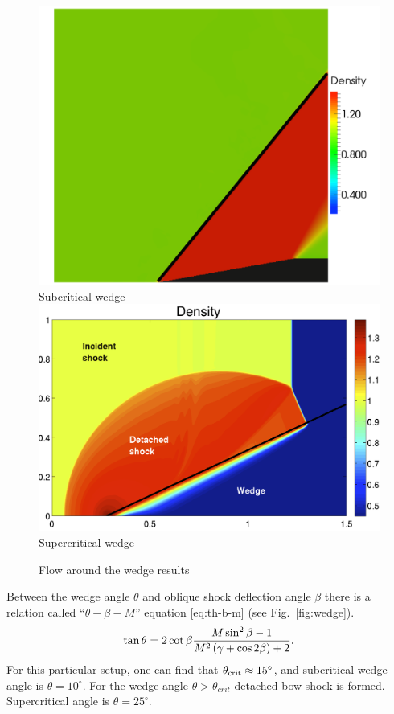 \begin{figure}[t!]
\centering \includegraphics[width=0.6\linewidth]{fig/wedge_sub.png}\\
Subcritical wedge\\
\includegraphics[width=0.6\linewidth]{fig/wedge_super.png}\\
Supercritical wedge\\
\caption{Flow around the wedge results \label{fig:wedge_res}}
\end{figure}
Between the wedge angle $\theta$ and oblique shock deflection angle $\beta$ there is a relation called ``$\theta-\beta-M$'' equation \eqref{eq:th-b-m} (see Fig.~\ref{fig:wedge}).
\begin{align}
\tan \theta = 2 \cot \beta \frac {M \sin^2 \beta - 1}{M^2 \left(\gamma + \cos 2 \beta\right) + 2}. \label{eq:th-b-m}
\end{align}
For this particular setup, one can find that $\theta_{\textmd{crit}} \approx 15^\circ$, and subcritical wedge angle is $\theta = 10^\circ$. For the wedge angle $\theta > \theta_{crit}$ detached bow shock is formed. Supercritical angle is $\theta = 25^\circ$.

